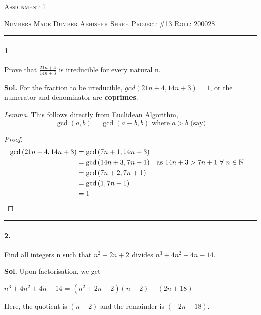 \documentclass[12pt]{amsart}
\begin{document}
\thispagestyle{empty}
\begin{center}
    
    {\scshape \large  Assignment 1}
\end{center}
{\scshape Numbers Made Dumber} \hfill 
\hfill {\scshape Abhishek Shree}
\linebreak
{\scshape Project \#13}  \hfill {\scshape Roll: 200028}


\smallskip

\hrule

\bigskip
\paragraph*{1} Prove that $\frac{21n+4}{14n+3}$ is irreducible for every natural n.

\bigskip
\textbf{Sol.}
For the fraction to be irreducible, $gcd(21n+4, 14n+3) = 1$, or the numerator and denominator are \textbf{coprimes}.

\textit{Lemma.} This follows directly from Euclidean Algorithm, \[ \gcd{(a,b)} = \gcd{(a-b, b)} \text{ where } a>b \text{ (say)} \]

\begin{proof}
    \begin{align*}
        \gcd{(21n+4, 14n+3)} &= \gcd{(7n+1, 14n+3)}
        \\ &= \gcd{(14n+3, 7n+1)} && \text{as } 14n+3 > 7n+1 \text{ } \forall \text{ } n \in \mathbb{N}
        \\ &= \gcd{(7n+2, 7n+1)}
        \\ &= \gcd{(1, 7n+1)}
        \\ &= 1 && \qedhere
    \end{align*}
\end{proof}

\par\noindent\textcolor{gray}{\rule{\textwidth}{0.5pt}}
\smallskip

\paragraph*{2.} Find all integers n such that $n^2 + 2n + 2$ divides $n^3 + 4n^2 + 4n - 14$.

\bigskip
\textbf{Sol.}
Upon factorisation, we get
\begin{center}
    $n^3 + 4n^2 + 4n - 14$ = $(n^2 + 2n + 2)(n+2) - (2n+18)$
\end{center}
Here, the quotient is $(n+2)$ and the remainder is $(-2n-18).$
\end{document}
